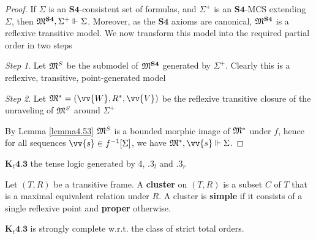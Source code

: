 \documentclass[11pt]{article}
\begin{document}
\begin{proof}
If \(\Sigma\) is an \(\textbf{S4}\)-consistent set of formulas, and \(\Sigma^+\) is an
\(\textbf{S4}\)-MCS extending \(\Sigma\), then \(\mathfrak{M}^{\textbf{S4}},\Sigma^+\Vdash\Sigma\).
Moreover, as the \(\textbf{S4}\) axioms are canonical, \(\mathfrak{M}^{\textbf{S4}}\)
is a reflexive transitive model. We now transform this model into the
required partial order in two steps

\emph{Step 1}. Let \(\mathfrak{M}^S\) be the submodel of \(\mathfrak{M}^{\textbf{S4}}\) generated by
\(\Sigma^+\). Clearly this is a reflexive, transitive, point-generated model

\emph{Step 2}. Let \(\fM^*=(\vv{W},R^*,\vv{V})\) be the reflexive transitive closure
of the unraveling of \(\mathfrak{M}^S\) around \(\Sigma^+\)

By Lemma \ref{lemma4.53} \(\mathfrak{M}^S\) is a bounded morphic image of \(\mathfrak{M}^*\)
under \(f\), hence for all sequences \(\vv{s}\in f^{-1}[\Sigma]\), we have \(\fM^*,\vv{s}\Vdash\Sigma\).
\end{proof}

\(\textbf{K}_t\textbf{4.3}\) the tense logic generated by 4, \(.3_l\) and \(.3_r\)

\begin{definition}[]
Let \((T,R)\) be a transitive frame. A \textbf{cluster} on \((T,R)\) is a subset \(C\)
of \(T\) that is a maximal equivalent relation under \(R\). A cluster is
\textbf{simple} if it consists of a single reflexive point and \textbf{proper} otherwise.
\end{definition}

\begin{theorem}[]
\(\textbf{K}_t\textbf{4.3}\) is strongly complete w.r.t. the class of strict
total orders.
\end{theorem}
\end{document}

